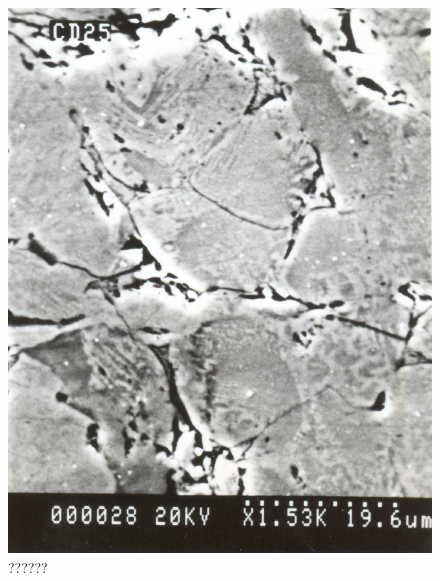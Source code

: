 \begin{figure}[H]
\renewcommand{\thefigure}{25D}
\includegraphics[scale=0.65]{images/chapter-4/fig025D.jpg}
\caption{??????}\label{chapter-4-fig25D}
\end{figure}

